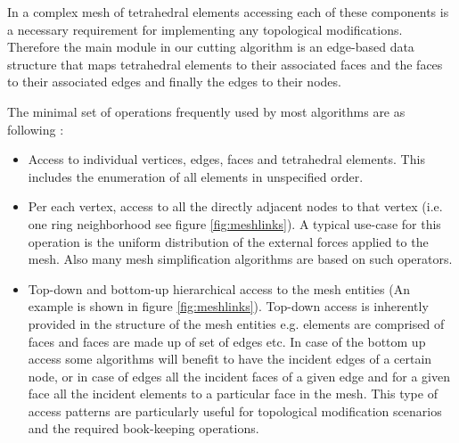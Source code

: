 In a complex mesh of tetrahedral elements accessing each of these components is a necessary requirement for 
implementing any topological modifications. Therefore the main module in our cutting algorithm is an edge-based
data structure that maps tetrahedral elements to their associated faces and the faces to their associated edges and
finally the edges to their nodes. 

The minimal set of operations frequently used by most algorithms are as following \cite{Mario2010PolygonMesh}:

\begin{itemize}
 \item Access to individual vertices, edges, faces and tetrahedral elements. This includes the enumeration of 
 all elements in unspecified order.
 
 \item Per each vertex, access to all the directly adjacent nodes to that vertex (i.e. one ring neighborhood see figure \ref{fig:meshlinks}). 
 A typical use-case for this operation is the uniform distribution of the external forces applied to the mesh. 
 Also many mesh simplification algorithms are based on such operators.
 
 \item Top-down and bottom-up hierarchical access to the mesh entities (An example is shown in figure \ref{fig:meshlinks}). Top-down access 
 is inherently provided in the structure of the mesh entities e.g. elements are comprised of faces and faces are made up of set of edges etc. 
 In case of the bottom up access some algorithms will benefit to have the incident edges of a certain node, or in case of edges all the incident 
 faces of a given edge and for a given face all the incident elements to a particular face in the mesh. This type of access patterns are particularly 
 useful for topological modification scenarios and the required book-keeping operations.
 

\end{itemize}
